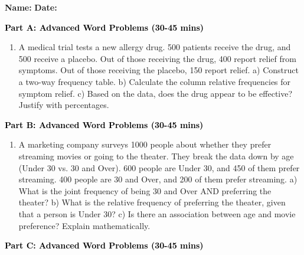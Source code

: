 \documentclass[12pt, letterpaper, fleqn]{article}
\begin{document}
\textbf{Name:} \underline{\hspace{5cm}}
\hfill
\textbf{Date:} \underline{\hspace{3cm}}\\


\begin{tcolorbox}[colback=customteal!20]
\large\textcolor{black}{\textbf{Part A: Advanced Word Problems (30-45 mins)}}
\end{tcolorbox}

\vspace{3mm}

\begin{enumerate}[itemsep=5.5cm, leftmargin=0.6cm]
\item A medical trial tests a new allergy drug. 500 patients receive the drug, and 500 receive a placebo. Out of those receiving the drug, 400 report relief from symptoms. Out of those receiving the placebo, 150 report relief. 
a) Construct a two-way frequency table.
b) Calculate the column relative frequencies for symptom relief.
c) Based on the data, does the drug appear to be effective? Justify with percentages.
\end{enumerate}

\newpage

\begin{tcolorbox}[colback=customteal!20]
\large\textcolor{black}{\textbf{Part B: Advanced Word Problems (30-45 mins)}}
\end{tcolorbox}

\vspace{3mm}

\begin{enumerate}[itemsep=5.5cm, leftmargin=0.6cm, resume]
\item A marketing company surveys 1000 people about whether they prefer streaming movies or going to the theater. They break the data down by age (Under 30 vs. 30 and Over). 600 people are Under 30, and 450 of them prefer streaming. 400 people are 30 and Over, and 200 of them prefer streaming.
a) What is the joint frequency of being 30 and Over AND preferring the theater?
b) What is the relative frequency of preferring the theater, given that a person is Under 30?
c) Is there an association between age and movie preference? Explain mathematically.
\end{enumerate}

\newpage

\begin{tcolorbox}[colback=customteal!20]
\large\textcolor{black}{\textbf{Part C: Advanced Word Problems (30-45 mins)}}
\end{tcolorbox}
\end{document}
